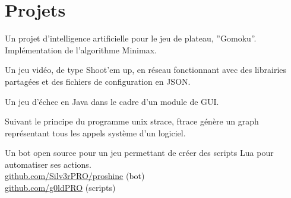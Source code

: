\documentclass[]{hieudo-build}
\begin{document}
\begin{minipage}[t]{0.65\textwidth}


\section{Projets}

Un projet d’intelligence artificielle pour le jeu de plateau, ”Gomoku”. Implémentation de l’algorithme Minimax.
\sectionsep

Un jeu vidéo, de type Shoot’em up, en réseau fonctionnant avec des librairies partagées et des fichiers de configuration en JSON.
\sectionsep

Un jeu d'échec en Java dans le cadre d'un module de GUI.
\sectionsep

Suivant le principe du programme unix strace, ftrace génère un graph représentant tous les appels système d'un logiciel.
\sectionsep

Un bot open source pour un jeu permettant de créer des scripts Lua pour automatiser ses actions. \\
\href{https://github.com/Silv3rPRO/proshine/}{github.com/Silv3rPRO/proshine} (bot) \\
\href{https://github.com/g0ldPRO}{github.com/g0ldPRO} (scripts)
\sectionsep

\end{minipage} 
\end{document}
